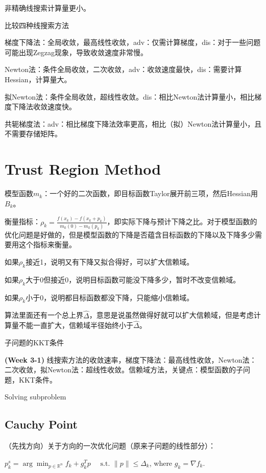 非精确线搜索计算量更小。

比较四种线搜索方法

梯度下降法：全局收敛，最高线性收敛，adv：仅需计算梯度，dis：对于一些问题可能出现Zegzag现象，导致收敛速度非常慢。

Newton法：条件全局收敛，二次收敛，adv：收敛速度最快，dis：需要计算Hessian，计算量大。

拟Newton法：条件全局收敛，超线性收敛。dis：相比Newton法计算量小，相比梯度下降法收敛速度快。

共轭梯度法：adv：相比梯度下降法效率更高，相比（拟）Newton法计算量小，且不需要存储矩阵。

\section{Trust Region Method}

模型函数$m_k$：一个好的二次函数，即目标函数Taylor展开前三项，然后Hessian用$B_k$。

衡量指标：$\rho_{k}=\frac{f\left(x_{k}\right)-f\left(x_{k}+p_{k}\right)}{m_{k}(0)-m_{k}\left(p_{k}\right)}$，即实际下降与预计下降之比。对于模型函数的优化问题是好做的，但是模型函数的下降是否蕴含目标函数的下降以及下降多少需要用这个指标来衡量。

如果$\rho_k$接近1，说明又有下降又拟合得好，可以扩大信赖域。

如果$\rho_k$大于0但接近0，说明目标函数可能没下降多少，暂时不改变信赖域。

如果$\rho_k$小于0，说明都目标函数都没下降，只能缩小信赖域。

算法里面还有一个总上界$\hat{\Delta}$，意思是说虽然做得好就可以扩大信赖域，但是考虑计算量不能一直扩大，信赖域半径始终小于$\hat{\Delta}$。

子问题的KKT条件

\begin{conc}
  \textbf{(Week 3-1)} 线搜索方法的收敛速率，梯度下降法：最高线性收敛，Newton法：二次收敛，拟Newton法：超线性收敛。信赖域方法，关键点：模型函数的子问题，KKT条件。
\end{conc}

Solving subproblem

\subsection{Cauchy Point}

（先找方向）关于方向的一次优化问题（原来子问题的线性部分）：

$p_{k}^{s}=\arg \min _{p \in \mathbb{R}^{n}} f_{k}+g_{k}^{T} p \quad \text { s.t. }\|p\| \leq \Delta_{k}$, where $g_k = \nabla f_k$.

